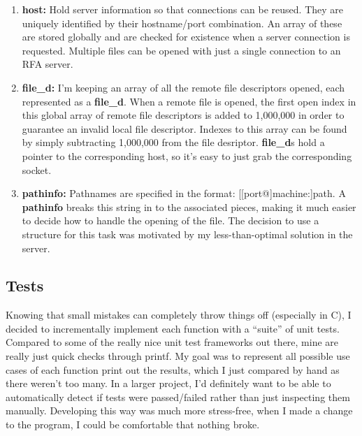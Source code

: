 \documentclass[a4paper,12pt]{article}
\begin{document}
\begin{enumerate}[1)]
  \item {\bf host:} Hold server information so that connections can be
    reused. They are uniquely identified by their hostname/port
    combination. An array of these are stored globally and are checked
    for existence when a server connection is requested. Multiple
    files can be opened with just a single connection to an RFA server.

  \item {\bf file\_d:} I'm keeping an array of all the remote file
    descriptors opened, each represented as a {\bf file\_d}. When a
    remote file is opened, the first open index in this global array
    of remote file descriptors is added to 1,000,000 in order to
    guarantee an invalid local file descriptor. Indexes to this array
    can be found by simply subtracting 1,000,000 from the file
    desriptor. {\bf file\_d}s hold a pointer to the corresponding
    host, so it's easy to just grab the corresponding socket.
    
  \item {\bf pathinfo:} Pathnames are specified in the format:
    [[port@]machine:]path. A {\bf pathinfo} breaks this string in to
    the associated pieces, making it much easier to decide how to
    handle the opening of the file. The decision to use a structure
    for this task was motivated by my less-than-optimal solution in
    the server.

\end{enumerate}

\subsection{Tests}
Knowing that small mistakes can completely throw things off
(especially in C), I decided to incrementally implement each function
with a ``suite'' of unit tests. Compared to some of the really nice
unit test frameworks out there, mine are really just quick checks
through printf. My goal was to represent all possible use cases of
each function print out the results, which I just compared by hand as
there weren't too many. In a larger project, I'd definitely want to be
able to automatically detect if tests were passed/failed rather than
just inspecting them manually. Developing this way was much more
stress-free, when I made a change to the program, I could be
comfortable that nothing broke.
\end{document}
